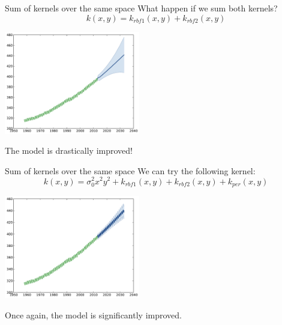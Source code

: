 \documentclass{beamer}
\begin{document}
\begin{frame}{Sum of kernels over the same space }
What happen if we sum both kernels?
\begin{equation*}
k(x,y) = k_{rbf1}(x,y) + k_{rbf2}(x,y)
\end{equation*} 
\pause
\begin{center}
\vspace{-8mm} \includegraphics[height=4.5cm]{figures/python/CO2-rbfab}
\end{center}
\begin{block}{}
\centering
\alert{The model is drastically improved!}
\end{block}
\end{frame}

\begin{frame}{Sum of kernels over the same space }
We can try the following kernel:
\begin{equation*}
k(x,y) = \sigma_0^2  x^2 y^2 + k_{rbf1}(x,y) + k_{rbf2}(x,y) + k_{per}(x,y)
\end{equation*}
\pause
\begin{center}
\vspace{-8mm}  \includegraphics[height=4.5cm]{figures/python/CO2-rbfabpq}
\end{center}
\begin{block}{}
\centering
\alert{Once again, the model is significantly improved.}
\end{block}
\end{frame}
\end{document}
